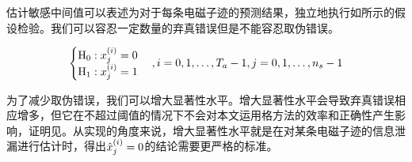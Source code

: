 {{	%
	估计敏感中间值可以表述为对于每条电磁子迹的预测结果，独立地执行如所示的假设检验。我们可以容忍一定数量的弃真错误但是不能容忍取伪错误。
	
	\begin{equation}
		\begin{cases}
			\mathrm H_0:x^{(i)}_j=0\\
			\mathrm H_{1}:x^{(i)}_j=1
		\end{cases},i=0,1,\dots,T_a-1,j=0,1,\dots,n_s-1
		\label{eq:determindewhich}
	\end{equation}
	
	为了减少取伪错误，我们可以增大显著性水平。增大显著性水平会导致弃真错误相应增多，但它在不超过阈值的情况下不会对本文运用格方法的效率和正确性产生影响，证明见。从实现的角度来说，增大显著性水平就是在对某条电磁子迹的信息泄漏进行估计时，得出$\hat{x}^{(i)}_j=0$的结论需要更严格的标准。
	
}}
